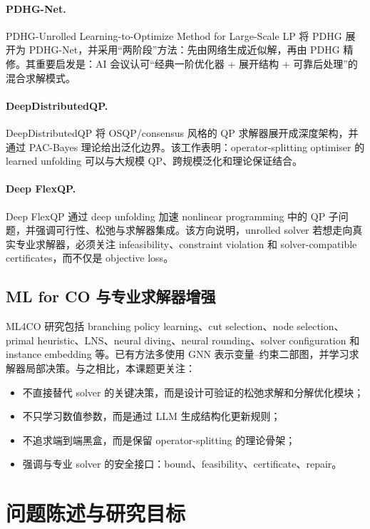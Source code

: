 \documentclass[UTF8,a4paper,12pt,fontset=fandol]{ctexart}
\begin{document}
\paragraph{PDHG-Net.}
PDHG-Unrolled Learning-to-Optimize Method for Large-Scale LP 将 PDHG 展开为 PDHG-Net，并采用“两阶段”方法：先由网络生成近似解，再由 PDHG 精修。其重要启发是：AI 会议认可“经典一阶优化器 + 展开结构 + 可靠后处理”的混合求解模式。

\paragraph{DeepDistributedQP.}
DeepDistributedQP 将 OSQP/consensus 风格的 QP 求解器展开成深度架构，并通过 PAC-Bayes 理论给出泛化边界。该工作表明：operator-splitting optimiser 的 learned unfolding 可以与大规模 QP、跨规模泛化和理论保证结合。

\paragraph{Deep FlexQP.}
Deep FlexQP 通过 deep unfolding 加速 nonlinear programming 中的 QP 子问题，并强调可行性、松弛与求解器集成。该方向说明，unrolled solver 若想走向真实专业求解器，必须关注 infeasibility、constraint violation 和 solver-compatible certificates，而不仅是 objective loss。

\subsection{ML for CO 与专业求解器增强}

ML4CO 研究包括 branching policy learning、cut selection、node selection、primal heuristic、LNS、neural diving、neural rounding、solver configuration 和 instance embedding 等。已有方法多使用 GNN 表示变量--约束二部图，并学习求解器局部决策。与之相比，本课题更关注：
\begin{itemize}[leftmargin=2em]
    \item 不直接替代 solver 的关键决策，而是设计可验证的松弛求解和分解优化模块；
    \item 不只学习数值参数，而是通过 LLM 生成结构化更新规则；
    \item 不追求端到端黑盒，而是保留 operator-splitting 的理论骨架；
    \item 强调与专业 solver 的安全接口：bound、feasibility、certificate、repair。
\end{itemize}

\section{问题陈述与研究目标}
\end{document}

